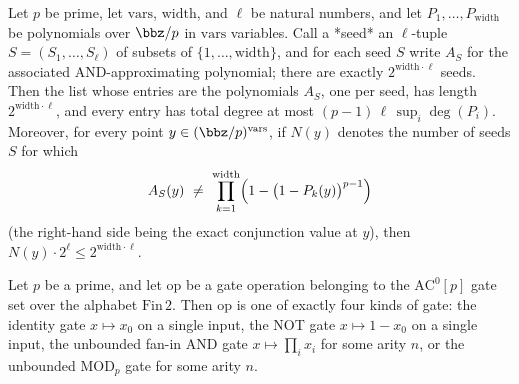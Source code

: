 \begin{theorem}
\label{RazborovSmolensky.exists_good_approxAnd}
\leanok
{}
Let $p$ be prime, let $\mathrm{vars}$, $\mathrm{width}$, and $\ell$ be natural numbers,
and let $P_1,\dots,P_{\mathrm{width}}$ be polynomials over $\bbz/p$ in $\mathrm{vars}$
variables. Call a *seed* an $\ell$-tuple $S=(S_1,\dots,S_\ell)$ of subsets of
$\{1,\dots,\mathrm{width}\}$, and for each seed $S$ write $A_S$ for the associated
AND-approximating polynomial; there are exactly $2^{\mathrm{width}\cdot\ell}$ seeds.
Then the list whose entries are the polynomials $A_S$, one per seed, has length
$2^{\mathrm{width}\cdot\ell}$, and every entry has total degree at most
$(p-1)\,\ell\,\sup_i \deg(P_i)$. Moreover, for every point
$y\in(\bbz/p)^{\mathrm{vars}}$, if $N(y)$ denotes the number of seeds $S$ for which
\[
A_S(y)\ \neq\ \prod_{k=1}^{\mathrm{width}}\Bigl(1-\bigl(1-P_k(y)\bigr)^{p-1}\Bigr)
\]
(the right-hand side being the exact conjunction value at $y$), then $N(y)\cdot
2^{\ell}\le 2^{\mathrm{width}\cdot\ell}$.
\end{theorem}

\begin{lemma}
\label{RazborovSmolensky.ACp_GateOps_cases}
\leanok
{}
Let $p$ be a prime, and let $\mathrm{op}$ be a gate operation belonging to the
$\mathrm{AC}^0[p]$ gate set over the alphabet $\mathrm{Fin}\,2$. Then $\mathrm{op}$ is
one of exactly four kinds of gate: the identity gate $x \mapsto x_0$ on a single input,
the NOT gate $x \mapsto 1 - x_0$ on a single input, the unbounded fan-in AND gate $x
\mapsto \prod_{i} x_i$ for some arity $n$, or the unbounded $\mathrm{MOD}_p$ gate for
some arity $n$.
\end{lemma}

